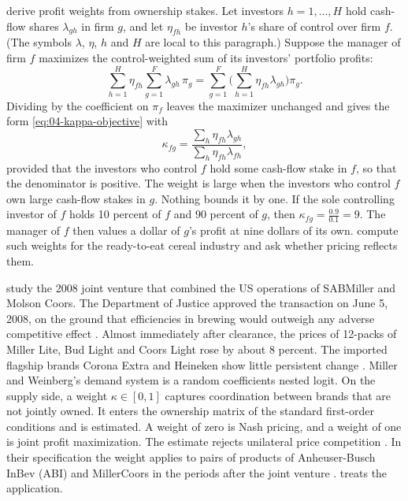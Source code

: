 \citet{OBrienSalop2000} derive profit weights from ownership stakes. Let investors $h = 1, \dots, H$ hold
cash-flow shares $\lambda_{gh}$ in firm $g$, and let $\eta_{fh}$ be investor $h$'s share of control over firm
$f$. (The symbols $\lambda$, $\eta$, $h$ and $H$ are local to this paragraph.) Suppose the manager of firm $f$
maximizes the control-weighted sum of its investors' portfolio profits:
\begin{equation*}
\sum_{h = 1}^{H}\eta_{fh}\sum_{g = 1}^{F}\lambda_{gh}\,\pi_g
= \sum_{g = 1}^{F}\Big(\sum_{h = 1}^{H}\eta_{fh}\lambda_{gh}\Big)\pi_g .
\end{equation*}
Dividing by the coefficient on $\pi_f$ leaves the maximizer unchanged and gives the form
\eqref{eq:04-kappa-objective} with
\begin{equation}\label{eq:04-obrien-salop}
\kappa_{fg} = \frac{\sum_{h}\eta_{fh}\lambda_{gh}}{\sum_{h}\eta_{fh}\lambda_{fh}} ,
\end{equation}
provided that the investors who control $f$ hold some cash-flow stake in $f$, so that the denominator is positive.
The weight is large when the investors who control $f$ own large cash-flow stakes in $g$. Nothing bounds it by
one. If the sole controlling investor of $f$ holds 10 percent of $f$ and 90 percent of $g$, then
$\kappa_{fg} = \frac{0.9}{0.1} = 9$. The manager of $f$ then values a dollar of $g$'s profit at nine dollars of
its own.
\citet{BackusConlonSinkinson2021} compute such weights for the ready-to-eat cereal industry and ask whether
pricing reflects them.

\citet{MillerWeinberg2017} study the 2008 joint venture that combined the US operations of SABMiller and Molson
Coors. The Department of Justice approved the transaction on June 5, 2008, on the ground that efficiencies in
brewing would outweigh any adverse competitive effect \citep[p.~241, n.~161]{AskerNocke2021}. Almost immediately after
clearance, the prices of 12-packs of Miller Lite, Bud Light and Coors Light rose by about 8 percent. The imported
flagship brands Corona Extra and Heineken show little persistent change \citep[p.~242]{AskerNocke2021}. Miller and
Weinberg's demand system is a random coefficients nested logit. On the supply side, a weight $\kappa \in [0, 1]$ captures coordination between
brands that are not jointly owned. It enters the ownership matrix of the standard first-order conditions and is
estimated. A weight of zero is Nash pricing, and a weight of one is joint profit maximization. The estimate rejects
unilateral price competition \citep[p.~242, n.~164]{AskerNocke2021}. In their specification the weight applies to
pairs of products of Anheuser-Busch InBev (ABI) and MillerCoors in the periods after the joint venture
\citep[Section~5.1, p.~1779]{MillerWeinberg2017}.  treats the application.

